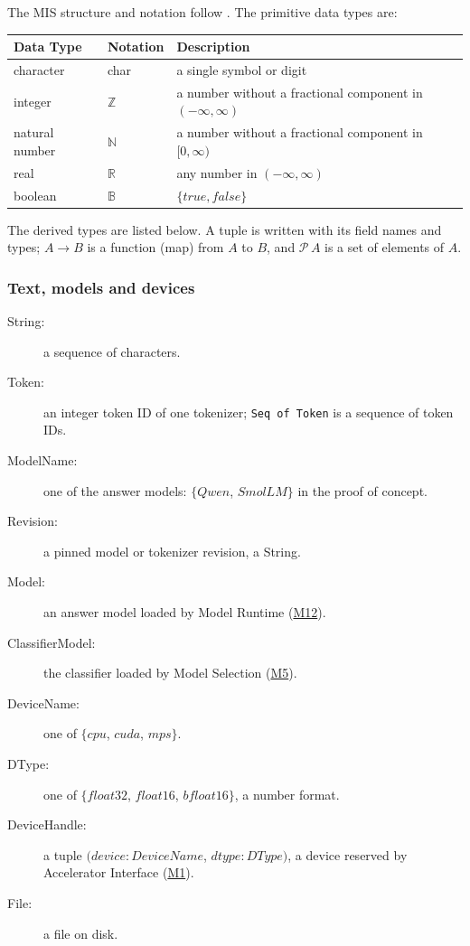\documentclass[12pt, titlepage]{article}
\begin{document}
The MIS structure and notation follow \citet{HoffmanAndStrooper1995}. The
primitive data types are:

\begin{center}
\renewcommand{\arraystretch}{1.2}
\begin{tabular}{l l p{7.5cm}}
\toprule
\textbf{Data Type} & \textbf{Notation} & \textbf{Description}\\
\midrule
character & char & a single symbol or digit\\
integer & $\mathbb{Z}$ & a number without a fractional component in $(-\infty, \infty)$\\
natural number & $\mathbb{N}$ & a number without a fractional component in $[0, \infty)$\\
real & $\mathbb{R}$ & any number in $(-\infty, \infty)$\\
boolean & $\mathbb{B}$ & $\{\mathit{true}, \mathit{false}\}$\\
\bottomrule
\end{tabular}
\end{center}

The derived types are listed below. A tuple is written with its field names and
types; $A \to B$ is a function (map) from $A$ to $B$, and $\mathcal{P}\,A$ is a
set of elements of $A$.

\subsubsection*{Text, models and devices}

\begin{description}
\item[String:] a sequence of characters.
\item[Token:] an integer token ID of one tokenizer; \texttt{Seq of Token} is a
  sequence of token IDs.
\item[ModelName:] one of the answer models: $\{\mathit{Qwen}$, $\mathit{SmolLM}\}$
  in the proof of concept.
\item[Revision:] a pinned model or tokenizer revision, a String.
\item[Model:] an answer model loaded by Model Runtime (\hyperref[mModelRun]{M12}).
\item[ClassifierModel:] the classifier loaded by Model Selection
  (\hyperref[mSelect]{M5}).
\item[DeviceName:] one of $\{\mathit{cpu}$, $\mathit{cuda}$, $\mathit{mps}\}$.
\item[DType:] one of $\{\mathit{float32}$, $\mathit{float16}$, $\mathit{bfloat16}\}$, a
  number format.
\item[DeviceHandle:] a tuple $(\mathit{device}: \mathit{DeviceName}$, $\mathit{dtype}:
  \mathit{DType})$, a device reserved by Accelerator Interface
  (\hyperref[mAccel]{M1}).
\item[File:] a file on disk.
\end{description}
\end{document}
